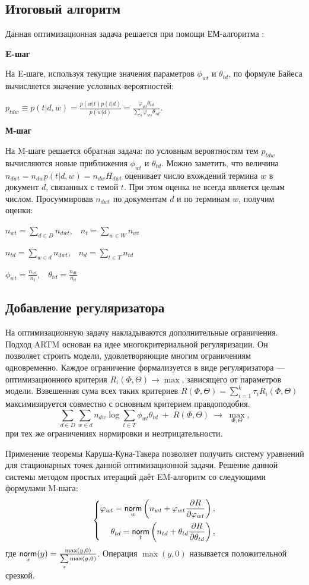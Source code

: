 \documentclass[12pt, twoside]{article}
\begin{document}
\subsection{Итоговый алгоритм}

Данная оптимизационная задача решается при помощи ЕМ-алгоритма \cite{plsadef2}:

\noindent\textbf{E-шаг}

На E-шаге, используя текущие значения параметров $\phi_{wt}$ и $\theta_{td}$, по формуле Байеса вычисляется значение условных вероятностей:

$p_{tdw} \equiv p(t|d,w) = \frac {p(w|t)p(t|d)} {p(w|d)} = \frac {\varphi_{wt}\theta_{td}} {\sum_s\varphi_{ws}\theta_{sd}}$.

\noindent\textbf{М-шаг}

На M-шаге решается обратная задача: по условным вероятностям тем $p_{tdw}$ вычисляются новые приближения $\phi_{wt}$ и $\theta_{td}$.
Можно заметить, что величина $n_{dwt}=n_{dw}p(t|d,w)=n_{dw}H_{dwt}$ оценивает число вхождений термина $w$ в документ $d$, связанных с темой $t$. При этом оценка не всегда является целым числом. Просуммировав $n_{dwt}$ по документам $d$ и по терминам $w$, получим оценки:

$n_{wt}=\sum_{d \in D} n_{dwt}$,~~$n_t = \sum_{w \in W}n_{wt}$

$n_{td}=\sum_{w \in d} n_{dwt}$,~~$n_d = \sum_{t \in T}n_{td}$

$\phi_{wt}=\frac{n_{wt}}{n_t}$,~~$\theta_{td} = \frac{n_{dt}}{n_{d}}$


\subsection{Добавление регуляризатора}
На оптимизационную задачу накладываются дополнительные ограничения. Подход ARTM \cite{artmdef1, artmdef2, artmdef3} основан на идее многокритериальной регуляризации. Он позволяет строить модели, удовлетворяющие многим ограничениям одновременно. Каждое ограничение формализуется в виде регуляризатора --- оптимизационного критерия $R_i(\Phi,\Theta)\to\max$, зависящего от параметров модели. Взвешенная сума всех таких критериев $R(\Phi,\Theta) = \sum_{i=1}^k \tau_i R_i(\Phi,\Theta)$ максимизируется совместно с основным критерием правдоподобия.
\[
\sum_{d\in D} \sum_{w\in d} n_{dw}\log \sum_{t\in T} \phi_{wt}\theta_{td} \;+\; R(\Phi,\Theta)\;\to\; \max_{\Phi,\Theta},
\]
при тех же ограничениях нормировки и неотрицательности.

Применение теоремы Каруша-Куна-Такера позволяет получить систему уравнений для стационарных точек данной оптимизационной задачи. Решение данной системы методом простых итераций даёт EM-алгоритм со следующими формулами M-шага:
\[
\left\{
	\begin{aligned}
\varphi_{wt} = \mathop{\mathsf{norm}}\limits_w  \left(n_{wt} + \varphi_{wt}\frac{\partial R}{\partial\varphi_{wt}}\right),\\
\theta_{td} = \mathop{\mathsf{norm}}\limits_t  \left(n_{td} + \theta_{td}\frac{\partial R}{\partial\theta_{td}}\right),
	\end{aligned}
\right.
\]
где $\norm_x(y) = \frac{\max(y, 0)}{\sum\limits_x \max(y, 0)}$. Операция $\max(y, 0)$ называется положительной срезкой.
\end{document}
